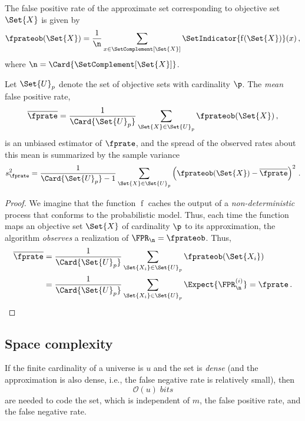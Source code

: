 \documentclass[ ../main.tex]{subfiles}
\begin{document}
The false positive rate of the approximate set corresponding 
to objective set $\Set{X}$ is given by
\begin{equation}
    \fprateob(\Set{X}) = \frac{1}{\n} \sum_{x \in \SetComplement[\Set{X}]} \SetIndicator{\operatorname{f}(\Set{X})}(x)\,,
\end{equation}
where $\n = \Card{\SetComplement[\Set{X}]}$.

Let $\Set{U}_p$ denote the set of objective sets with cardinality $\p$. The 
\emph{mean} false positive rate,
\begin{equation}
    \overline{\fprate} = \frac{1}{\Card{\Set{U}_p}}
        \sum_{\Set{X} \in \Set{U}_p} \fprateob(\Set{X})\,,
\end{equation}
is an unbiased estimator of $\fprate$, and the spread of the observed rates about
this mean is summarized by the sample variance
\begin{equation}
    s^2_\fprate = \frac{1}{\Card{\Set{U}_p} - 1}
        \sum_{\Set{X} \in \Set{U}_p} \left(\fprateob(\Set{X}) - \overline{\fprate}\right)^2\,.
\end{equation}
\begin{proof}
We imagine that the function $\operatorname{f}$ caches the output of a 
\emph{non-deterministic} process that conforms to the probabilistic model. Thus, 
each time the function maps an objective set $\Set{X}$ of cardinality $\p$ to 
its approximation, the algorithm \emph{observes} a realization of 
$\FPR_\n = \fprateob$. Thus,
\begin{align}
    \overline{\fprate}
        &= \frac{1}{\Card{\Set{U}_p}} 
            \sum_{\Set{X_i} \in \Set{U}_p} \fprateob(\Set{X_i})\\
        &= \frac{1}{\Card{\Set{U}_p}} 
            \sum_{\Set{X_i} \in \Set{U}_p} \Expect{\FPR_\n^{(i)}} = \fprate\,.
\end{align}
\end{proof}

\subsection{Space complexity}
\label{sec:space_comp}
If the finite cardinality of a universe is $u$ and the set is \emph{dense} (and 
the approximation is also dense, i.e., the false negative rate is relatively 
small), then
\begin{equation}
    \mathcal{O}(u) \; \si{bits}
\end{equation}
are needed to code the set, which is independent of $m$, the false positive 
rate, and the false negative rate.
\end{document}
